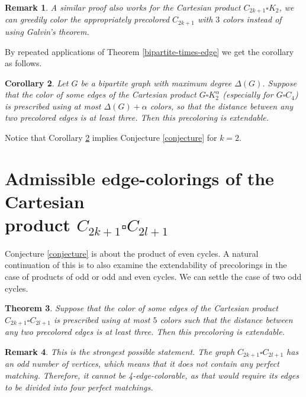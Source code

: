 \documentclass[a4paper,12pt]{article}
\newtheorem{theorem}{\bf Theorem}[section]
\newtheorem{cor}[theorem]{\bf Corollary}
\newtheorem{remark}[theorem]{\bf Remark}
\begin{document}
\begin{remark}
    \textup{A similar proof also works for the Cartesian product $C_{2k+1} \square K_{2}$, we can greedily color the appropriately precolored $C_{2k+1}$ with $3$ colors instead of using Galvin's theorem.}
\end{remark}

By repeated applications of Theorem \ref{bipartite-times-edge} we get the corollary as follows.

\begin{cor} \label{c_4}
    Let $G$ be a bipartite graph with maximum degree $\Delta(G)$. Suppose that the color of some edges of the Cartesian product $G \square K_{2}^{\alpha}$ (especially for $G \square C_4$) is prescribed using at most $\Delta(G)+\alpha$ colors, so that the distance between any two precolored edges is at least three. Then this precoloring is extendable.
\end{cor}

Notice that Corollary \ref{c_4} implies Conjecture \ref{conjecture} for $k=2$.





\section{Admissible edge-colorings of the Cartesian \\ product $C_{2k+1} \square C_{2l+1}$}

Conjecture \ref{conjecture} is about the product of even cycles. A natural continuation of this is to also examine the extendability of precolorings in the case of products of odd or odd and even cycles. We can settle the case of two odd cycles.

\sloppy
\begin{theorem} \label{odd-times-odd}
    Suppose that the color of some edges of the Cartesian product $C_{2k+1} \square C_{2l+1}$ is prescribed using at most $5$ colors such that the distance between any two precolored edges is at least three. Then this precoloring is extendable.
\end{theorem}

\begin{remark}
    \textup{This is the strongest possible statement. The graph $C_{2k+1} \square C_{2l+1}$ has an odd number of vertices, which means that it does not contain any perfect matching. Therefore, it cannot be 4-edge-colorable, as that would require its edges to be divided into four perfect matchings.}
\end{remark}
\fussy
\end{document}
